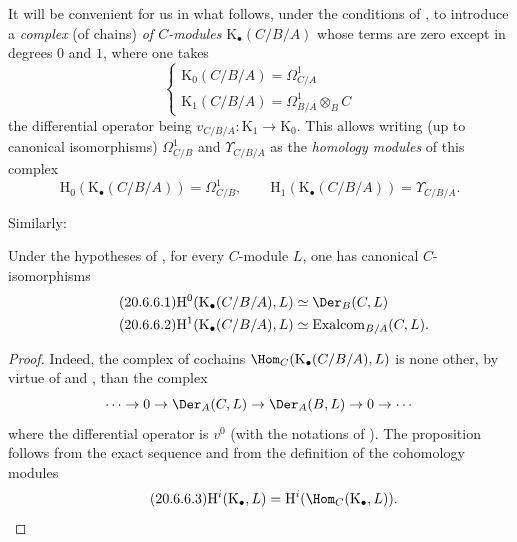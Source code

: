 \begin{env}[20.6.5]
\label{0.20.6.5}
It will be convenient for us in what follows, under the conditions of , to introduce a \emph{complex} (of chains) \emph{of $C$-modules} $\mathrm{K}_\bullet(C/B/A)$ whose terms are zero except in degrees $0$ and $1$, where one takes
\begin{equation}
\tag{20.6.5.1}
  \label{0.20.6.5.1}
  \begin{cases}
  \mathrm{K}_0(C/B/A)=\Omega^1_{C/A} \\
  \mathrm{K}_1(C/B/A)=\Omega^1_{B/A}\otimes_B C
  \end{cases}
\end{equation}
the differential operator being $v_{C/B/A}:\mathrm{K}_1\to\mathrm{K}_0$.
This allows writing (up to canonical isomorphisms) $\Omega^1_{C/B}$ and $\Upsilon_{C/B/A}$ as the \emph{homology modules} of this complex
\begin{equation}
\tag{20.6.5.2}
  \label{0.20.6.5.2}
  \mathrm{H}_0(\mathrm{K}_\bullet(C/B/A))=\Omega^1_{C/B},\qquad \mathrm{H}_1(\mathrm{K}_\bullet(C/B/A))=\Upsilon_{C/B/A}.
\end{equation}
\end{env}

Similarly:
\begin{proposition}[20.6.6]
\label{0.20.6.6}
Under the hypotheses of , for every $C$-module $L$, one has canonical $C$-isomorphisms
\begin{align}
\tag{20.6.6.1}
  \label{0.20.6.6.1}
  \mathrm{H}^0(\mathrm{K}_\bullet(C/B/A),L) &\simeq\Der_B(C,L) \\
\tag{20.6.6.2}
  \label{0.20.6.6.2}
  \mathrm{H}^1(\mathrm{K}_\bullet(C/B/A),L) &\simeq\operatorname{Exalcom}_{B/A}(C,L).
\end{align}
\end{proposition}

\begin{proof}
Indeed, the complex of cochains $\Hom_C(\mathrm{K}_\bullet(C/B/A),L)$ is none other, by virtue of  and , than the complex
\[
  \cdots\to 0\to\Der_A(C,L)\to\Der_A(B,L)\to 0\to\cdots
\]
where the differential operator is $v^0$ (with the notations of ).
The proposition follows from the exact sequence  and from the definition of the cohomology modules
\begin{equation}
\tag{20.6.6.3}
  \label{0.20.6.6.3}
  \mathrm{H}^i(\mathrm{K}_\bullet,L)=\mathrm{H}^i(\Hom_C(\mathrm{K}_\bullet,L)).
\end{equation}
\end{proof}

